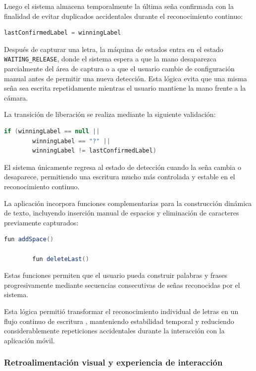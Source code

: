 	Luego el sistema almacena temporalmente la última seña confirmada con la finalidad de evitar duplicados accidentales durante el reconocimiento continuo:
	
	\begin{lstlisting}[language=java]
		lastConfirmedLabel = winningLabel
	\end{lstlisting}
	
	Después de capturar una letra, la máquina de estados entra en el estado \texttt{WAITING\_RELEASE}, donde el sistema espera a que la mano desaparezca parcialmente del área de captura o a que el usuario cambie de configuración manual antes de permitir una nueva detección. Esta lógica evita que una misma seña sea escrita repetidamente mientras el usuario mantiene la mano frente a la cámara.
	
	La transición de liberación se realiza mediante la siguiente validación:
	
	\begin{lstlisting}[language=java]
		if (winningLabel == null ||
		winningLabel == "?" ||
		winningLabel != lastConfirmedLabel)
	\end{lstlisting}
	
	El sistema únicamente regresa al estado de detección cuando la seña cambia o desaparece, permitiendo una escritura mucho más controlada y estable en el reconocimiento continuo.
	
	La aplicación incorpora funciones complementarias para la construcción dinámica de texto, incluyendo inserción manual de espacios y eliminación de caracteres previamente capturados:
	
	\begin{lstlisting}[language=java]
		fun addSpace()
		
		fun deleteLast()
	\end{lstlisting}
	
	Estas funciones permiten que el usuario pueda construir palabras y frases progresivamente mediante secuencias consecutivas de señas reconocidas por el sistema.
	
	Esta lógica permitió transformar el reconocimiento individual de letras en un flujo continuo de escritura , manteniendo estabilidad temporal y reduciendo considerablemente repeticiones accidentales durante la interacción con la aplicación móvil.
	
	\subsubsection{Retroalimentación visual y experiencia de interacción}
	
